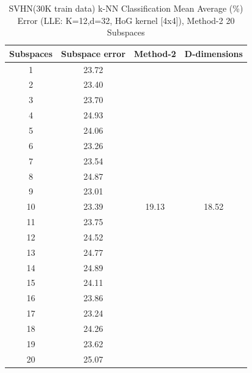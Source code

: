 \begin{table}[H]
\centering
\label{tab:table18}
\begin{tabular}{|c|c|c|c|}
\hline
\textlatin{Subspaces} & \textlatin{Subspace error} & \textlatin{Method-2} & \textlatin{D-dimensions}  \\
\hline
1 & 23.72 & & \\
2 & 23.40 & & \\
3 & 23.70 & & \\
4 & 24.93 & & \\
5 & 24.06 & & \\
6 & 23.26 & & \\
7 & 23.54 &  & \\
8 & 24.87 & & \\
9 & 23.01 &  & \\
10 & 23.39 & 19.13 & 18.52 \\
11 & 23.75 & & \\
12 & 24.52 &  & \\
13 & 24.77 &  & \\
14 & 24.89 & & \\
15 & 24.11 & & \\
16 & 23.86 & & \\
17 & 23.24 &  & \\
18 & 24.26 & & \\
19 & 23.62 &  & \\
20 & 25.07 &  & \\
\hline
\end{tabular}
\caption{\textlatin{SVHN(30K train data) k-NN Classification Mean Average (\%) Error (LLE: K=12,d=32, HoG kernel [4x4]), Method-2 20 Subspaces}}
\end{table}